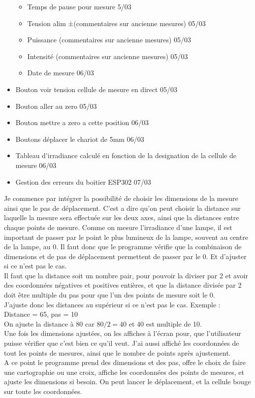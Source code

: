 \documentclass[12pt]{article}
\begin{document}
\begin{itemize}
\begin{itemize}
	\item  Temps de pause pour mesure  5/03
	\item  Tension alim ±(commentaires sur ancienne mesures)  05/03
	\item  Puissance (commentaires sur ancienne mesures)  05/03
	\item  Intensité (commentaires sur ancienne mesures)  05/03
	\item  Date de mesure  06/03
		\end{itemize}
	\item  Bouton voir tension cellule de mesure en direct  05/03
	\item  Bouton aller au zero  05/03
	\item  Bouton mettre a zero a cette position  06/03
	\item  Boutons déplacer le chariot de 5mm  06/03
	\item  Tableau d'irradiance calculé en fonction de la designation de la cellule de mesure  06/03
	\item  Gestion des erreurs du boitier ESP302 07/03
\end{itemize}


Je commence par intégrer la possibilité de choisir les dimensions de la mesure ainsi que le pas de déplacement.
C'est a dire qu'on peut choisir la distance sur laquelle la mesure sera effectuée sur les deux axes, ainsi que la distances entre chaque points de mesure.
Comme on mesure l'irradiance d'une lampe, il est important de passer par le point le plus lumineux de la lampe, souvent au centre de la lampe, au 0.
Il faut donc que le programme vérifie que la combinaison de dimensions et de pas de déplacement permettent de passer par le 0.
Et d'ajuster si ce n'est pas le cas.\\
Il faut que la distance soit un nombre pair, pour pouvoir la diviser par 2 et avoir des coordonnées négatives et positives entières, et que la distance divisée par 2 doit être multiple du pas pour que l'un des points de mesure soit le 0.\\
J'ajuste donc les distances au supérieur si ce n'est pas le cas. Exemple :\\
Distance = 65, pas = 10\\
On ajuste la distance à 80 car $80/2 = 40$ et 40 est multiple de 10.\\
Une fois les dimensions ajustées, on les affiches à l'écran pour, que l'utilisateur puisse vérifier que c'est bien ce qu'il veut.
J'ai aussi affiché les coordonnées de tout les points de mesures, ainsi que le nombre de points après ajustement.\\
A ce point le programme prend des dimensions et des pas, offre le choix de faire une cartographie ou une croix, affiche les coordonnées des points de mesures, et ajuste les dimensions si besoin.
On peut lancer le déplacement, et la cellule bouge sur toute les coordonnées.
\end{document}
